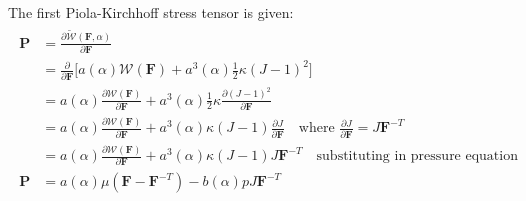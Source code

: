 \documentclass[12pt,3p]{article}
\numberwithin{equation}{section}
\begin{document}
The first Piola-Kirchhoff stress tensor is given: 
\begin{align}\label{eq_firstPK}
\begin{split}
\mathbf{P} &= \frac{\partial \widetilde{\mathcal{W}}(\mathbf{F},\alpha)}{\partial \mathbf{F}} \\
		 &= \frac{\partial}{\partial \mathbf{F}} \bigg[ a(\alpha)\mathcal{W}(\mathbf{F}) + a^3(\alpha) \frac{1}{2}\kappa\left(J-1\right)^2 \bigg] \\
		 &= a(\alpha)\frac{\partial \mathcal{W}(\mathbf{F})}{\partial \mathbf{F}} + a^3(\alpha) \frac{1}{2} \kappa \frac{\partial (J-1)^2}{\partial \mathbf{F}}  \\
		 &= a(\alpha)\frac{\partial \mathcal{W}(\mathbf{F})}{\partial \mathbf{F}} + a^3(\alpha)\kappa\left(J-1\right)\frac{\partial J}{\partial \mathbf{F}} \quad \text{where } \frac{\partial J}{\partial \mathbf{F}} = J \mathbf{F}^{-T} \\
		 &= a(\alpha)\frac{\partial \mathcal{W}(\mathbf{F})}{\partial \mathbf{F}} + a^3(\alpha)\kappa (J-1) J \mathbf{F}^{-T} \quad \text{substituting in pressure equation} \\
\mathbf{P} &= a (\alpha) \mu (\mathbf{F} - \mathbf{F}^{-T}) - b(\alpha) p J \mathbf{F}^{-T} 
\end{split}
\end{align}

\end{document}
